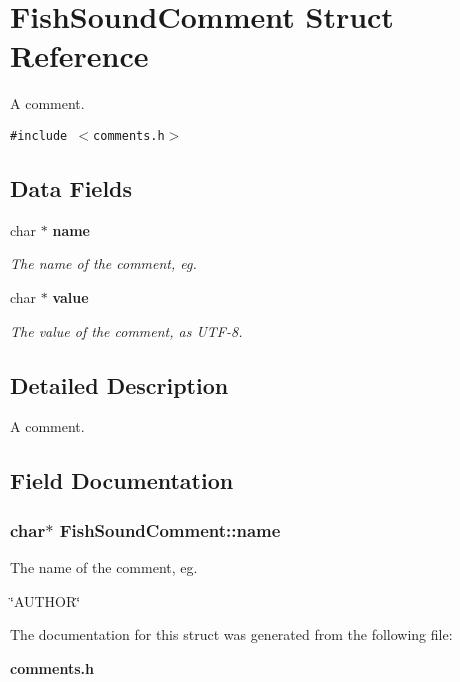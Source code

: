 \section{FishSoundComment Struct Reference}
\label{structFishSoundComment}
A comment.  


{\tt \#include $<$comments.h$>$}

\subsection*{Data Fields}
\begin{CompactItemize}
\item 
char $\ast$ {\bf name}
\begin{CompactList}\small\item\em The name of the comment, eg. \item\end{CompactList}\item 
char $\ast$ {\bf value}\label{structFishSoundComment_4293f69fe0e695fc9102e1667ce9add1}

\begin{CompactList}\small\item\em The value of the comment, as UTF-8. \item\end{CompactList}\end{CompactItemize}


\subsection{Detailed Description}
A comment. 

\subsection{Field Documentation}
\subsubsection[{name}]{\setlength{\rightskip}{0pt plus 5cm}char$\ast$ {\bf FishSoundComment::name}}\label{structFishSoundComment_ededfdcebf50dc81cce9d714e5cda6df}


The name of the comment, eg. 

\char`\"{}AUTHOR\char`\"{} 

The documentation for this struct was generated from the following file:\begin{CompactItemize}
\item 
{\bf comments.h}\end{CompactItemize}
